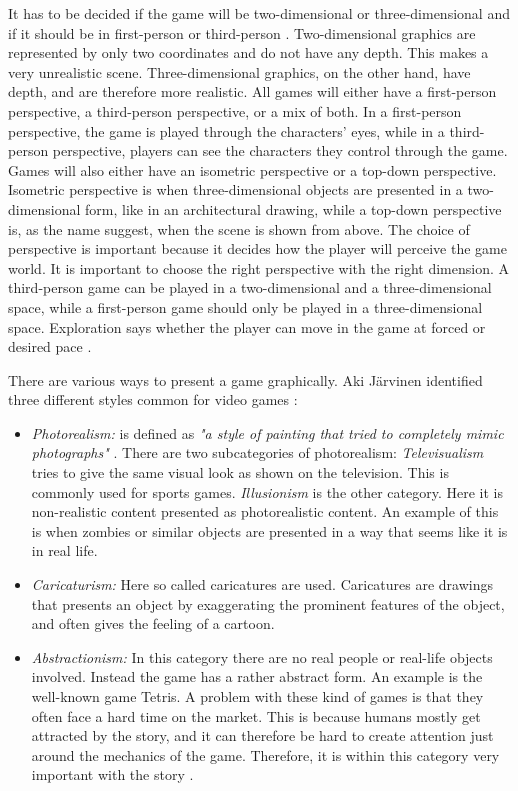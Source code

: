 It has to be decided if the game will be two-dimensional or three-dimensional and if it should be in first-person or third-person \cite{understandingvg}. Two-dimensional graphics are represented by only two coordinates and do not have any depth. This makes a very unrealistic scene. Three-dimensional graphics, on the other hand, have depth, and are therefore more realistic. All games will either have a first-person perspective, a third-person perspective, or a mix of both. In a first-person perspective, the game is played through the characters' eyes, while in a third-person perspective, players can see the characters they control through the game. Games will also either have an isometric perspective or a top-down perspective. Isometric perspective is when three-dimensional objects are presented in a two-dimensional form, like in an architectural drawing, while a top-down perspective is, as the name suggest, when the scene is shown from above. The choice of perspective is important because it decides how the player will perceive the game world. It is important to choose the right perspective with the right dimension. A third-person game can be played in a two-dimensional and a three-dimensional space, while a first-person game should only be played in a three-dimensional space. Exploration says whether the player can move in the game at forced or desired pace \cite{understandingvg}.

There are various ways to present a game graphically. Aki Järvinen identified three different styles common for video games \cite{understandingvg}: 

\begin{itemize}
\item \emph{Photorealism:} is defined as \emph{"a style of painting that tried to completely mimic photographs"} \cite{understandingvg}. There are two subcategories of photorealism: \emph{Televisualism} tries to give the same visual look as shown on the television. This is commonly used for sports games. \emph{Illusionism} is the other category. Here it is non-realistic content presented as photorealistic content. An example of this is when zombies or similar objects are presented in a way that seems like it is in real life.  
\item \emph{Caricaturism:} Here so called caricatures are used. Caricatures are drawings that presents an object by exaggerating the prominent features of the object, and often gives the feeling of a cartoon. 
\item \emph{Abstractionism:} In this category there are no real people or real-life objects involved. Instead  the game has a rather abstract form. An example is the well-known game Tetris. A problem with these kind of games is that they often face a hard time on the market. This is because humans mostly get attracted by the story, and it can therefore be hard to create attention just around the mechanics of the game. Therefore, it is within this category very important with the story \cite{understandingvg}. 
\end{itemize}

